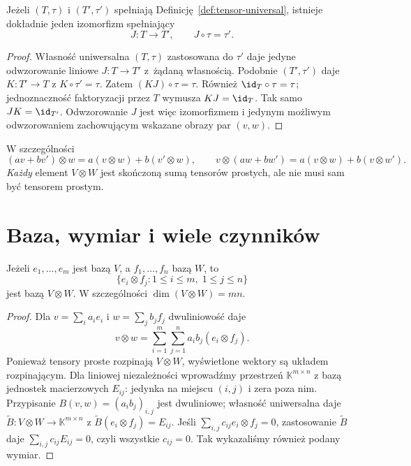 \begin{twierdzenie}[Jednoznaczność]
\label{thm:tensor-jednoznacznosc}
Jeżeli $(T,\tau)$ i $(T',\tau')$ spełniają
Definicję~\ref{def:tensor-universal}, istnieje dokładnie jeden
izomorfizm spełniający
\[
 J\colon T\to T',\qquad J\circ\tau=\tau'.
\]
\end{twierdzenie}
\begin{proof}
Własność uniwersalna $(T,\tau)$ zastosowana do $\tau'$ daje
jedyne odwzorowanie liniowe $J\colon T\to T'$ z~żądaną własnością.
Podobnie $(T',\tau')$ daje $K\colon T'\to T$ z
$K\circ\tau'=\tau$. Zatem $(KJ)\circ\tau=\tau$.
Również $\id_T\circ\tau=\tau$; jednoznaczność faktoryzacji
przez $T$ wymusza $KJ=\id_T$. Tak samo $JK=\id_{T'}$.
Odwzorowanie $J$ jest więc izomorfizmem i jedynym możliwym odwzorowaniem
zachowującym wskazane obrazy par $(v,w)$.
\end{proof}

W szczególności
\begin{equation}\label{eq:tensor-biliniowosc}
 (av+bv')\otimes w=a(v\otimes w)+b(v'\otimes w),\qquad
 v\otimes(aw+bw')=a(v\otimes w)+b(v\otimes w').
\end{equation}
\emph{Każdy} element $V\otimes W$ jest skończoną sumą tensorów
prostych, ale nie musi sam być tensorem prostym.

\section{Baza, wymiar i wiele czynników}
\label{sec:baza-tensorowa}

\begin{twierdzenie}
\label{thm:baza-tensorowa}
Jeżeli $e_1,\ldots,e_m$ jest bazą $V$, a
$f_1,\ldots,f_n$ bazą $W$, to
\[
 \bigl\{e_i\otimes f_j:1\leq i\leq m,\;1\leq j\leq n\bigr\}
\]
jest bazą $V\otimes W$. W szczególności
$\dim(V\otimes W)=mn$.
\end{twierdzenie}
\begin{proof}
Dla $v=\sum_i a_i e_i$ i $w=\sum_j b_j f_j$ dwuliniowość daje
\[
 v\otimes w=\sum_{i=1}^m\sum_{j=1}^n a_ib_j(e_i\otimes f_j).
\]
Ponieważ tensory proste rozpinają $V\otimes W$, wyświetlone
wektory są układem rozpinającym. Dla liniowej niezależności
wprowadźmy przestrzeń $\mathbb K^{m\times n}$ z bazą jednostek
macierzowych $E_{ij}$: jedynka na miejscu $(i,j)$ i zera poza nim. Przypisanie
$B(v,w)=(a_i b_j)_{i,j}$ jest dwuliniowe; własność uniwersalna
daje $\widetilde B\colon V\otimes W\to\mathbb K^{m\times n}$
z $\widetilde B(e_i\otimes f_j)=E_{ij}$. Jeśli
$\sum_{i,j}c_{ij}e_i\otimes f_j=0$, zastosowanie
$\widetilde B$ daje $\sum_{i,j}c_{ij}E_{ij}=0$, czyli
wszystkie $c_{ij}=0$. Tak wykazaliśmy również podany wymiar.
\end{proof}

